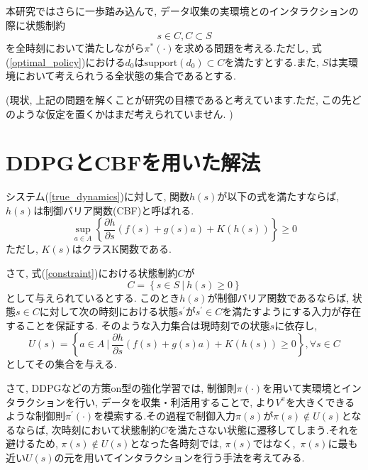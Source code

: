 \documentclass{jsarticle}
\newcommand{\pdif}[2]{\frac{\partial#1}{\partial#2}}
\begin{document}
本研究ではさらに一歩踏み込んで, データ収集の実環境とのインタラクションの際に状態制約
\begin{equation}
	s\in C, C\subset S \label{constraint}
\end{equation}
を全時刻において満たしながら$\pi^{*}(\cdot)$を求める問題を考える.ただし, 式(\ref{optimal_policy})における$d_0$は$\textrm{support}(d_0)\subset C$を満たすとする.また, $S$は実環境において考えられうる全状態の集合であるとする.\par
\color{red}(現状, 上記の問題を解くことが研究の目標であると考えています.ただ, この先どのような仮定を置くかはまだ考えられていません. )

\color{black}
\section{DDPGとCBFを用いた解法}
システム(\ref{true_dynamics})に対して, 関数$h(s)$が以下の式を満たすならば,~$h(s)$は制御バリア関数(CBF)と呼ばれる.
\begin{equation}
	\sup_{a\in A}\left\{\pdif{h}{s}(f(s)+g(s)a)+K(h(s))\right\} \geq 0 \label{CBF}
\end{equation}
ただし, $K(s)$はクラスK関数である.\par
さて, 式(\ref{constraint})における状態制約$C$が
\begin{equation}
	C = \left\{s \in S~|~h(s)\geq 0\right\}
\end{equation}
として与えられているとする. このとき$h(s)$が制御バリア関数であるならば, 状態$s\in C$に対して次の時刻における状態$s^{\prime}$が$s^{\prime}\in C$を満たすようにする入力が存在することを保証する. そのような入力集合は現時刻での状態$s$に依存し,
\begin{equation}
	U(s) = \left\{a \in A~|~\pdif{h}{s}(f(s)+g(s)a)+K(h(s))\geq 0\right\}, \forall s\in C
\end{equation}
としてその集合を与える.\par
さて, DDPGなどの方策on型の強化学習では, 制御則$\pi(\cdot)$を用いて実環境とインタラクションを行い, データを収集・利活用することで, より$V^{\pi}$を大きくできるような制御則$\pi^{\prime}(\cdot)$を模索する.その過程で制御入力$\pi(s)$が$\pi(s)\notin U(s)$となるならば, 次時刻において状態制約$C$を満たさない状態に遷移してしまう.それを避けるため, $\pi(s)\notin U(s)$となった各時刻では, $\pi(s)$ではなく,~$\pi(s)$に最も近い$U(s)$の元を用いてインタラクションを行う手法を考えてみる.
\end{document}
